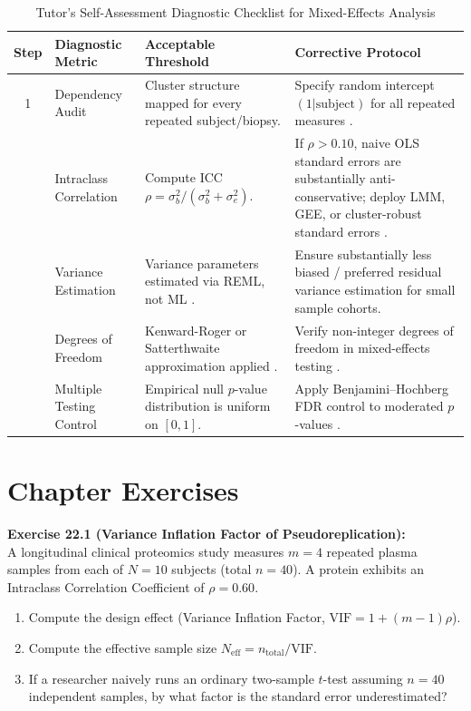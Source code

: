 \documentclass[11pt,twoside,openright]{book}
\begin{document}
\begin{table}[!ht]
\centering
\caption{Tutor's Self-Assessment Diagnostic Checklist for Mixed-Effects Analysis}
\label{tab:repeated_checklist}
\small
\begin{tabularx}{\textwidth}{c p{3.8cm} p{4.6cm} X}
\toprule
\textbf{Step} & \textbf{Diagnostic Metric} & \textbf{Acceptable Threshold} & \textbf{Corrective Protocol} \\
\midrule
1 & Dependency Audit & Cluster structure mapped for every repeated subject/biopsy. & Specify random intercept $(1 | \text{subject})$ for all repeated measures \cite{pinheiro2000mixed}. \\
\addlinespace
2 & Intraclass Correlation & Compute ICC $\rho = \sigma_b^2 / (\sigma_b^2 + \sigma_e^2)$. & If $\rho > 0.10$, naive OLS standard errors are substantially anti-conservative; deploy LMM, GEE, or cluster-robust standard errors \cite{hoffman2016variancepartition}. \\
\addlinespace
3 & Variance Estimation & Variance parameters estimated via REML, not ML \cite{patterson1971recovery}. & Ensure substantially less biased / preferred residual variance estimation for small sample cohorts. \\
\addlinespace
4 & Degrees of Freedom & Kenward-Roger or Satterthwaite approximation applied \cite{kenward1997small}. & Verify non-integer degrees of freedom in mixed-effects testing \cite{kuznetsova2017lmertest}. \\
\addlinespace
5 & Multiple Testing Control & Empirical null $p$-value distribution is uniform on $[0, 1]$. & Apply Benjamini--Hochberg FDR control to moderated $p$-values \cite{benjamini1995controlling}. \\
\bottomrule
\end{tabularx}
\end{table}

\clearpage

\section{Chapter Exercises}

\noindent
\textbf{Exercise 22.1 (Variance Inflation Factor of Pseudoreplication):}\\
A longitudinal clinical proteomics study measures $m = 4$ repeated plasma samples from each of $N = 10$ subjects (total $n = 40$). A protein exhibits an Intraclass Correlation Coefficient of $\rho = 0.60$.
\begin{enumerate}
    \item Compute the design effect (Variance Inflation Factor, $\text{VIF} = 1 + (m - 1)\rho$).
    \item Compute the effective sample size $N_{\text{eff}} = n_{\text{total}} / \text{VIF}$.
    \item If a researcher naively runs an ordinary two-sample $t$-test assuming $n = 40$ independent samples, by what factor is the standard error underestimated?
\end{enumerate}
\end{document}
